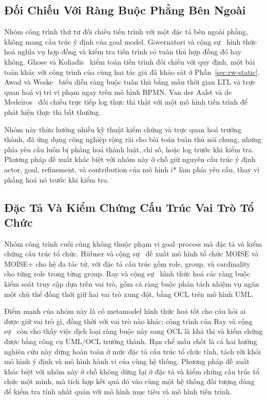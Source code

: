 \subsection{Đối Chiếu Với Ràng Buộc Phẳng Bên Ngoài}\label{sec:rw-external}

Nhóm công trình thứ tư đối chiếu tiến trình với một đặc tả bên ngoài phẳng, không mang cấu trúc ý
định của goal model. Governatori và cộng sự~\cite{governatori2006compliance} hình thức hoá nghĩa vụ
hợp đồng và kiểm tra tiến trình có tuân thủ hợp đồng đó hay không. Ghose và
Koliadis~\cite{ghose2007auditing} kiểm toán tiến trình đối chiếu với quy định, một bài toán khác với
công trình của cùng hai tác giả đã khảo sát ở Phần~\ref{sec:rw-static}. Awad và
Weske~\cite{awad2009visualization} biểu diễn ràng buộc tuân thủ bằng mẫu thời gian LTL và trực quan
hoá vị trí vi phạm ngay trên mô hình BPMN. Van der Aalst và de Medeiros~\cite{aalst2005conformance}
đối chiếu trực tiếp log thực thi thật với một mô hình tiến trình để phát hiện thực thi bất thường.

Nhóm này thừa hưởng nhiều kỹ thuật kiểm chứng và trực quan hoá trưởng thành, đã ứng dụng công nghiệp
rộng rãi cho bài toán tuân thủ nói chung, nhưng phía yêu cầu luôn bị phẳng hoá thành luật, chỉ số,
hoặc log trước khi kiểm tra. Phương pháp đề xuất khác biệt với nhóm này ở chỗ giữ nguyên cấu trúc ý
định actor, goal, refinement, và contribution của mô hình i* làm phía yêu cầu, thay vì phẳng hoá nó
trước khi kiểm tra.

\subsection{Đặc Tả Và Kiểm Chứng Cấu Trúc Vai Trò Tổ Chức}\label{sec:rw-structure}

Nhóm công trình cuối cùng không thuộc phạm vi goal--process mà đặc tả và kiểm chứng cấu trúc tổ
chức. Hübner và cộng sự~\cite{hubner2002moise,hubner2007moiseplus} đề xuất mô hình tổ chức MOISE và
MOISE+ cho hệ đa tác tử, với đặc tả cấu trúc gồm role, group, và cardinality cho từng role trong
từng group. Ray và cộng sự~\cite{ray2004rbacuml} hình thức hoá các ràng buộc kiểm soát truy cập dựa
trên vai trò, gồm cả ràng buộc phân tách nhiệm vụ ngăn một chủ thể đồng thời giữ hai vai trò xung
đột, bằng OCL trên mô hình UML.

Điểm mạnh của nhóm này là có metamodel hình thức hoá tốt cho câu hỏi ai được giữ vai trò gì, đồng
thời với vai trò nào khác; công trình của Ray và cộng sự~\cite{ray2004rbacuml} còn cho thấy việc
dịch loại ràng buộc này sang OCL là khả thi và kiểm chứng được bằng công cụ UML/OCL trưởng thành.
Hạn chế mấu chốt là cả hai hướng nghiên cứu này dừng hoàn toàn ở mức đặc tả cấu trúc tổ chức tĩnh,
tách rời khỏi mô hình ý định và mô hình hành vi của cùng hệ thống. Phương pháp đề xuất khác biệt với
nhóm này ở chỗ không dừng lại ở đặc tả và kiểm chứng cấu trúc tổ chức một mình, mà tích hợp kết quả
đó vào cùng một hệ thống đối tượng dùng để kiểm tra tính nhất quán với mô hình mục tiêu và mô hình
tiến trình.

